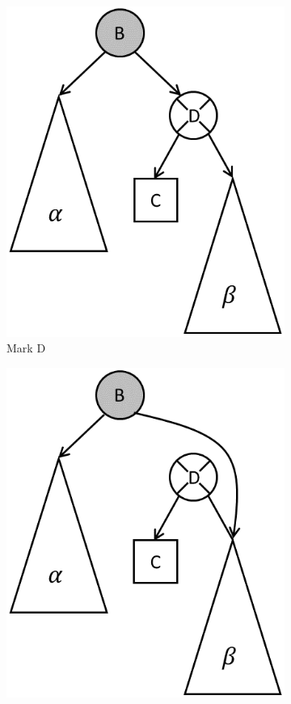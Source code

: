 \documentclass[letterpaper]{article}
\begin{document}
\begin{figure}[!bt]
\begin{subfigure}[b]{0.2\textwidth}
		\includegraphics[width=1\textwidth]{bst_del_3.png} 
		\caption{Mark D}
	\end{subfigure}
	\qquad
	\begin{subfigure}[b]{0.2\textwidth}\centering
		\includegraphics[width=1\textwidth]{bst_del_4.png} 

\end{subfigure}
\end{figure}
\end{document}
